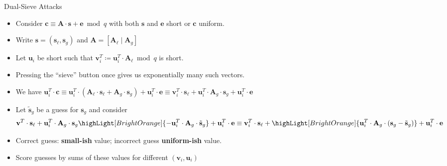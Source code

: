 \documentclass[xcolor=table,10pt,aspectratio=169]{beamer}
\renewcommand{\vec}[1]{\ensuremath{\mathbf{#1}}\xspace}
\providecommand{\mat}[1]{\ensuremath{\vec{#1}}\xspace}
\begin{document}
\begin{frame}[label={sec:orgeba1d45}]{Dual-Sieve Attacks}
\begin{itemize}
\item Consider \(\vec{c} \equiv \mat{A} \cdot \vec{s} + \vec{e} \bmod q\) with both \(\vec{s}\) and \(\vec{e}\) short or \(\vec{c}\) uniform.
\item Write \(\vec{s} = (\vec{s}_{\ell}, \vec{s}_{g})\) and \(\mat{A} = [\mat{A}_{\ell} \mid \mat{A}_{g}]\)
\item Let \(\vec{u}_{i}\) be short such that \(\vec{v}_i^{T} \coloneqq \vec{u}_i^{T} \cdot \mat{A}_{\ell} \bmod q\)  is short.
\item Pressing the ``sieve'' button once gives us exponentially many such vectors.
\item We have
\(
\vec{u}_i^{T} \cdot \vec{c}
\equiv \vec{u}_i^{T} \cdot (\vec{A}_{\ell} \cdot \vec{s}_{\ell} + \vec{A}_{g} \cdot \vec{s}_{g})  + \vec{u}_i^{T} \cdot \vec{e}
\equiv \vec{v}_i^{T} \cdot \vec{s}_{\ell} + \vec{u}_i^{T} \cdot \vec{A}_{g} \cdot \vec{s}_{g} +  \vec{u}_i^{T}\cdot \vec{e}
\)
\item Let \(\tilde{\vec{s}}_{g}\) be a guess for \(\vec{s}_{g}\) and consider
  \[
  \vec{v}^{T} \cdot \vec{s}_{\ell} + \vec{u}_i^{T} \cdot \vec{A}_{g} \cdot \vec{s}_{g} \highLight[BrightOrange]{- \vec{u}_i^{T} \cdot \vec{A}_{g} \cdot \tilde{\vec{s}}_{g}} + \vec{u}_i^{T}\cdot \vec{e}
  \equiv \vec{v}_i^{T} \cdot \vec{s}_{\ell}
  + \highLight[BrightOrange]{\vec{u}_i^{T} \cdot \vec{A}_{g} \cdot \left(\vec{s}_{g} - \tilde{\vec{s}}_{g}\right)}
  + \vec{u}_i^{T}\cdot \vec{e}
\]\vspace{-\baselineskip}
\item Correct guess: \textbf{small-ish} value; incorrect guess \textbf{uniform-ish} value.
\item Score guesses by sums of these values for different \((\vec{v}_i, \vec{u}_i)\)
\end{itemize}
\end{frame}
\end{document}
